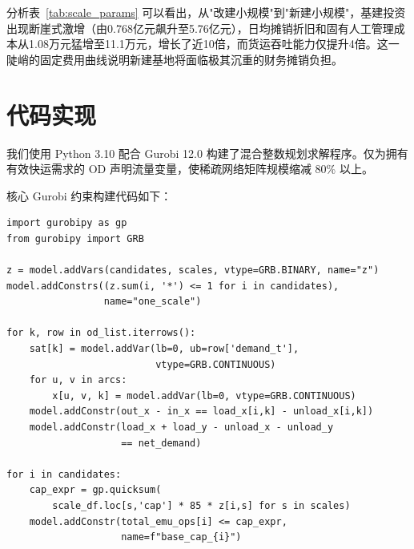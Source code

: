 \documentclass[12pt,a4paper,fontset=none]{ctexart}
\begin{document}
分析表~\ref{tab:scale_params} 可以看出，从"改建小规模"到"新建小规模"，基建投资出现断崖式激增（由0.768亿元飙升至5.76亿元），日均摊销折旧和固有人工管理成本从1.08万元猛增至11.1万元，增长了近10倍，而货运吞吐能力仅提升4倍。这一陡峭的固定费用曲线说明新建基地将面临极其沉重的财务摊销负担。

\begin{table}[H]
\centering
\caption{运输模式参数}
\label{tab:train_params}
\end{table}

\section{代码实现}

我们使用 Python 3.10 配合 Gurobi 12.0 构建了混合整数规划求解程序。仅为拥有有效快运需求的 OD 声明流量变量，使稀疏网络矩阵规模缩减 80\% 以上。

核心 Gurobi 约束构建代码如下：

{\small\begin{verbatim}
import gurobipy as gp
from gurobipy import GRB

z = model.addVars(candidates, scales, vtype=GRB.BINARY, name="z")
model.addConstrs((z.sum(i, '*') <= 1 for i in candidates),
                 name="one_scale")

for k, row in od_list.iterrows():
    sat[k] = model.addVar(lb=0, ub=row['demand_t'],
                          vtype=GRB.CONTINUOUS)
    for u, v in arcs:
        x[u, v, k] = model.addVar(lb=0, vtype=GRB.CONTINUOUS)
    model.addConstr(out_x - in_x == load_x[i,k] - unload_x[i,k])
    model.addConstr(load_x + load_y - unload_x - unload_y
                    == net_demand)

for i in candidates:
    cap_expr = gp.quicksum(
        scale_df.loc[s,'cap'] * 85 * z[i,s] for s in scales)
    model.addConstr(total_emu_ops[i] <= cap_expr,
                    name=f"base_cap_{i}")
\end{verbatim}}
\end{document}
